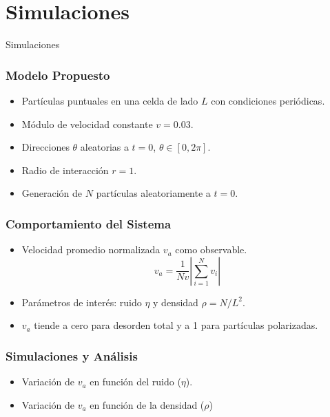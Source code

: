 \section{Simulaciones}

{
\begin{frame}
    \centering
  \Huge
  Simulaciones
\end{frame}
}

\begin{frame}
\frametitle{Modelo Propuesto}
\begin{itemize}
    \item Partículas puntuales en una celda de lado \(L\) con condiciones periódicas.
    \item Módulo de velocidad constante \(v = 0.03\).
    \item Direcciones \(\theta\) aleatorias a \(t=0\), \(\theta \in [0, 2\pi]\).
    \item Radio de interacción \(r = 1\).
    \item Generación de \(N\) partículas aleatoriamente a \(t = 0\).
\end{itemize}
\end{frame}



\begin{frame}
\frametitle{Comportamiento del Sistema}
\begin{itemize}
    \item Velocidad promedio normalizada \(v_a\) como observable.
    \[    v_a = \frac{1}{Nv} \left| \sum^{N}_{i=1} v_i \right|
\]
    \item Parámetros de interés: ruido \(\eta\) y densidad \(\rho = N / L^2\).
    \item \(v_a\) tiende a cero para desorden total y a 1 para partículas polarizadas.
\end{itemize}
\end{frame}

\begin{frame}
\frametitle{Simulaciones y Análisis}
\begin{itemize}
    \item Variación de \(v_a\) en función del ruido (\(\eta\)).
        \item Variación de \(v_a\) en función de la densidad (\(\rho\))
\end{itemize}
\end{frame}

